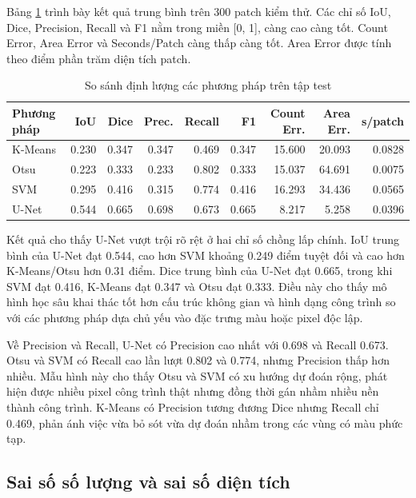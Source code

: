 \documentclass[12pt,a4paper]{report}
\begin{document}
Bảng \ref{tab:main-results} trình bày kết quả trung bình trên 300 patch kiểm thử. Các chỉ số IoU, Dice, Precision, Recall và F1 nằm trong miền [0, 1], càng cao càng tốt. Count Error, Area Error và Seconds/Patch càng thấp càng tốt. Area Error được tính theo điểm phần trăm diện tích patch.

\begin{table}[htbp]
\centering
\caption{So sánh định lượng các phương pháp trên tập test}
\label{tab:main-results}
\small
\setlength{\tabcolsep}{3pt}
\renewcommand{\arraystretch}{1.15}
\begin{tabular}{|l|r|r|r|r|r|r|r|r|}
\hline
\textbf{Phương pháp} & \textbf{IoU} & \textbf{Dice} & \textbf{Prec.} & \textbf{Recall} & \textbf{F1} & \textbf{Count Err.} & \textbf{Area Err.} & \textbf{s/patch}\\
\hline
K-Means & 0.230 & 0.347 & 0.347 & 0.469 & 0.347 & 15.600 & 20.093 & 0.0828\\
\hline
Otsu & 0.223 & 0.333 & 0.233 & 0.802 & 0.333 & 15.037 & 64.691 & 0.0075\\
\hline
SVM & 0.295 & 0.416 & 0.315 & 0.774 & 0.416 & 16.293 & 34.436 & 0.0565\\
\hline
U-Net & 0.544 & 0.665 & 0.698 & 0.673 & 0.665 & 8.217 & 5.258 & 0.0396\\
\hline
\end{tabular}
\end{table}

Kết quả cho thấy U-Net vượt trội rõ rệt ở hai chỉ số chồng lấp chính. IoU trung bình của U-Net đạt 0.544, cao hơn SVM khoảng 0.249 điểm tuyệt đối và cao hơn K-Means/Otsu hơn 0.31 điểm. Dice trung bình của U-Net đạt 0.665, trong khi SVM đạt 0.416, K-Means đạt 0.347 và Otsu đạt 0.333. Điều này cho thấy mô hình học sâu khai thác tốt hơn cấu trúc không gian và hình dạng công trình so với các phương pháp dựa chủ yếu vào đặc trưng màu hoặc pixel độc lập.

Về Precision và Recall, U-Net có Precision cao nhất với 0.698 và Recall 0.673. Otsu và SVM có Recall cao lần lượt 0.802 và 0.774, nhưng Precision thấp hơn nhiều. Mẫu hình này cho thấy Otsu và SVM có xu hướng dự đoán rộng, phát hiện được nhiều pixel công trình thật nhưng đồng thời gán nhầm nhiều nền thành công trình. K-Means có Precision tương đương Dice nhưng Recall chỉ 0.469, phản ánh việc vừa bỏ sót vừa dự đoán nhầm trong các vùng có màu phức tạp.

\subsection{Sai số số lượng và sai số diện tích}
\end{document}
